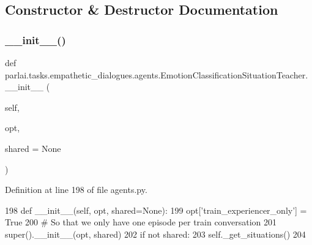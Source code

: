 \subsection{Constructor \& Destructor Documentation}
\mbox{\label{classparlai_1_1tasks_1_1empathetic__dialogues_1_1agents_1_1EmotionClassificationSituationTeacher_a766744d3e042178441a778fb8686b050}} 
\subsubsection{\texorpdfstring{\+\_\+\+\_\+init\+\_\+\+\_\+()}{\_\_init\_\_()}}
{\footnotesize\ttfamily def parlai.\+tasks.\+empathetic\+\_\+dialogues.\+agents.\+Emotion\+Classification\+Situation\+Teacher.\+\_\+\+\_\+init\+\_\+\+\_\+ (\begin{DoxyParamCaption}\item[{}]{self,  }\item[{}]{opt,  }\item[{}]{shared = {\ttfamily None} }\end{DoxyParamCaption})}



Definition at line 198 of file agents.\+py.


\begin{DoxyCode}
198     \textcolor{keyword}{def }\_\_init\_\_(self, opt, shared=None):
199         opt[\textcolor{stringliteral}{'train\_experiencer\_only'}] = \textcolor{keyword}{True}
200         \textcolor{comment}{# So that we only have one episode per train conversation}
201         super().\_\_init\_\_(opt, shared)
202         \textcolor{keywordflow}{if} \textcolor{keywordflow}{not} shared:
203             self.\_get\_situations()
204 
\end{DoxyCode}


